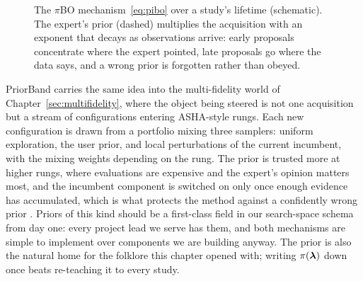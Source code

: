 \begin{figure}[t]
\centering
{}
\caption{The $\pi$BO mechanism~\eqref{eq:pibo} over a study's lifetime
(schematic). The expert's prior (dashed) multiplies the acquisition with
an exponent that decays as observations arrive: early proposals
concentrate where the expert pointed, late proposals go where the data
says, and a wrong prior is forgotten rather than obeyed.}
\label{fig:pibo}
\end{figure}

PriorBand carries the same idea into the multi-fidelity world of
Chapter~\ref{sec:multifidelity}, where the object being steered is not
one acquisition but a stream of configurations entering ASHA-style rungs.
Each new configuration is drawn from a portfolio mixing three samplers:
uniform exploration, the user prior, and local perturbations of the
current incumbent, with the mixing weights depending on the rung. The
prior is trusted more at higher rungs, where evaluations are expensive
and the expert's opinion matters most, and the incumbent component is
switched on only once enough evidence has accumulated, which is what
protects the method against a confidently wrong prior
\citep{mallik2023priorband}. Priors of this kind should be a first-class
field in our search-space schema from day one: every project lead we
serve has them, and both mechanisms are simple to implement over
components we are building anyway. The prior is also the natural home
for the folklore this chapter opened with; writing
$\pi(\bm{\lambda})$ down once beats re-teaching it to every study.

